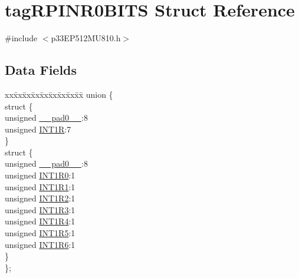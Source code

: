 \hypertarget{structtag_r_p_i_n_r0_b_i_t_s}{}\section{tag\+R\+P\+I\+N\+R0\+B\+I\+TS Struct Reference}
\label{structtag_r_p_i_n_r0_b_i_t_s}


{\ttfamily \#include $<$p33\+E\+P512\+M\+U810.\+h$>$}

\subsection*{Data Fields}
\begin{DoxyCompactItemize}
\item 
\begin{tabbing}
xx\=xx\=xx\=xx\=xx\=xx\=xx\=xx\=xx\=\kill
union \{\\
\>struct \{\\
\>\>unsigned \hyperlink{structtag_r_p_i_n_r0_b_i_t_s_adf71f3d8410c1f1dbbc96680a92c49af}{\_\_pad0\_\_}:8\\
\>\>unsigned \hyperlink{structtag_r_p_i_n_r0_b_i_t_s_a2186340f5b560f5ce87d2baa9495c858}{INT1R}:7\\
\>\} \\
\>struct \{\\
\>\>unsigned \hyperlink{structtag_r_p_i_n_r0_b_i_t_s_adf71f3d8410c1f1dbbc96680a92c49af}{\_\_pad0\_\_}:8\\
\>\>unsigned \hyperlink{structtag_r_p_i_n_r0_b_i_t_s_a41c84a640db658c69769b405ed407f71}{INT1R0}:1\\
\>\>unsigned \hyperlink{structtag_r_p_i_n_r0_b_i_t_s_af1a03873268d095f1ce65e7fd4dc4cd7}{INT1R1}:1\\
\>\>unsigned \hyperlink{structtag_r_p_i_n_r0_b_i_t_s_afdc96a05b0a78638642a56d217d4f331}{INT1R2}:1\\
\>\>unsigned \hyperlink{structtag_r_p_i_n_r0_b_i_t_s_ad655d1f7ece0a99df0627f9cec6f3be8}{INT1R3}:1\\
\>\>unsigned \hyperlink{structtag_r_p_i_n_r0_b_i_t_s_a4234a8551565ac915fadf2f447ba1072}{INT1R4}:1\\
\>\>unsigned \hyperlink{structtag_r_p_i_n_r0_b_i_t_s_ad492f57a2eb3397726044db795accb27}{INT1R5}:1\\
\>\>unsigned \hyperlink{structtag_r_p_i_n_r0_b_i_t_s_a80e119cffb6d38b53bc3fdf773aa9c16}{INT1R6}:1\\
\>\} \\
\}; \\

\end{tabbing}\end{DoxyCompactItemize}


